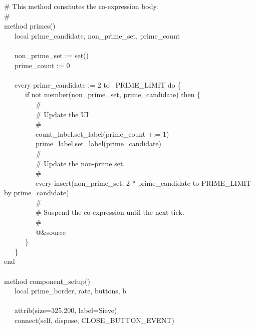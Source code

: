 {\>   \# This method consitutes the co-expression body. \\
\>   \# \\
\>   method primes() \\
\>   \ \ \ local prime\_candidate, non\_prime\_set, prime\_count \\
\ \\
\>   \ \ \ non\_prime\_set := set() \\
\>   \ \ \ prime\_count := 0 \\
\ \\
\>   \ \ \ every prime\_candidate := 2 to \ PRIME\_LIMIT do \{ \\
\>   \ \ \ \ \ \ if not member(non\_prime\_set, prime\_candidate) then
\{ \\
\>   \ \ \ \ \ \ \ \ \ \# \\
\>   \ \ \ \ \ \ \ \ \ \# Update the UI \\
\>   \ \ \ \ \ \ \ \ \ \# \\
\>   \ \ \ \ \ \ \ \ \ count\_label.set\_label(prime\_count +:= 1) \\
\>   \ \ \ \ \ \ \ \ \ prime\_label.set\_label(prime\_candidate) \\
\>   \ \ \ \ \ \ \ \ \ \# \\
\>   \ \ \ \ \ \ \ \ \ \# Update the non-prime set. \\
\>   \ \ \ \ \ \ \ \ \ \# \\
\>   \ \ \ \ \ \ \ \ \ every insert(non\_prime\_set, 2 *
prime\_candidate to PRIME\_LIMIT by prime\_candidate) \\
\>   \ \ \ \ \ \ \ \ \ \# \\
\>   \ \ \ \ \ \ \ \ \ \# Suspend the co-expression until the next
tick. \\
\>   \ \ \ \ \ \ \ \ \ \# \\
\>   \ \ \ \ \ \ \ \ \ @\&source \\
\>   \ \ \ \ \ \ \} \\
\>   \ \ \ \} \\
\>   end \\
\ \\
\>   method component\_setup() \\
\>   \ \ \ local prime\_border, rate, buttons, b \\
\ \\
\>   \ \ \ attrib({\textquotedbl}size=325,200{\textquotedbl},
{\textquotedbl}label=Sieve{\textquotedbl}) \\
\>   \ \ \ connect(self, {\textquotedbl}dispose{\textquotedbl},
CLOSE\_BUTTON\_EVENT) \\
}
